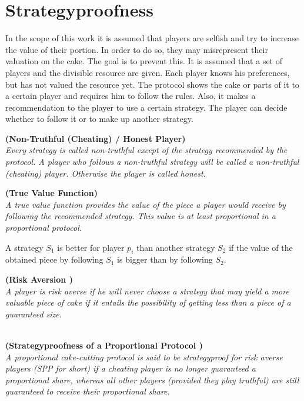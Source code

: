 \section{Strategyproofness}
\label{sven_hat_recht}
In the scope of this work it is assumed that players are selfish and try to increase the value of their portion. In order to do so, they may misrepresent their valuation on the cake. The goal is to prevent this.
It is assumed that a set of players and the divisible resource are given. Each player knows his preferences, but has not valued the resource yet. The protocol shows the cake or parts of it to a certain player and requires him to follow the rules. Also, it makes a recommendation to the player to use a certain strategy. The player can decide whether to follow it or to make up another strategy.
\begin{defi}{\textbf{(Non-Truthful (Cheating) / Honest Player)}}\\
\emph{Every strategy is called \emph{non-truthful} except of the strategy recommended by the protocol. A player who follows a non-truthful strategy will be called a \emph{non-truthful (cheating) player}. Otherwise the player is called \emph{honest}.}
\end{defi}
\begin{defi}{\textbf{(True Value Function)}}\\
\emph{A \emph{true value function} provides the value of the piece a player would receive by following the recommended strategy. This value is at least proportional in a proportional protocol.}
\end{defi}
A strategy $S_{1}$ is better for player $p_{i}$ than another strategy $S_{2}$ if the value of the obtained piece by following $S_{1}$ is bigger than by following $S_{2}$.
\begin{defi}{\textbf{(Risk Aversion \cite{brams})}}\\
\emph{A player is \emph{risk averse} if he will never choose a strategy that may yield a more valuable piece of cake if it entails the possibility of getting less than a piece of a guaranteed size.}
\end{defi}
\begin{defi}{\textbf{\\(Strategyproofness of a Proportional Protocol \cite{lindner:degrees})}}\\
\emph{A proportional cake-cutting protocol is said to be \emph{strategyproof for risk averse players} (SPP for short) if a cheating player is no longer guaranteed a proportional share, whereas all other players (provided they play truthful) are still guaranteed to receive their proportional share.}
\end{defi}

